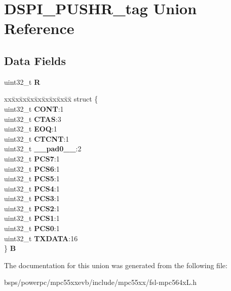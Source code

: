\hypertarget{unionDSPI__PUSHR__tag}{}\section{D\+S\+P\+I\+\_\+\+P\+U\+S\+H\+R\+\_\+tag Union Reference}
\label{unionDSPI__PUSHR__tag}
\subsection*{Data Fields}
\begin{DoxyCompactItemize}
\item 
\mbox{\label{unionDSPI__PUSHR__tag_a521f8ec0aa91d4ba7795fc6c94f2215a}} 
uint32\+\_\+t {\bfseries R}
\item 
\mbox{\label{unionDSPI__PUSHR__tag_a2f18a2239ed951a858642061508555af}} 
\begin{tabbing}
xx\=xx\=xx\=xx\=xx\=xx\=xx\=xx\=xx\=\kill
struct \{\\
\>uint32\_t {\bfseries CONT}:1\\
\>uint32\_t {\bfseries CTAS}:3\\
\>uint32\_t {\bfseries EOQ}:1\\
\>uint32\_t {\bfseries CTCNT}:1\\
\>uint32\_t {\bfseries \_\_pad0\_\_}:2\\
\>uint32\_t {\bfseries PCS7}:1\\
\>uint32\_t {\bfseries PCS6}:1\\
\>uint32\_t {\bfseries PCS5}:1\\
\>uint32\_t {\bfseries PCS4}:1\\
\>uint32\_t {\bfseries PCS3}:1\\
\>uint32\_t {\bfseries PCS2}:1\\
\>uint32\_t {\bfseries PCS1}:1\\
\>uint32\_t {\bfseries PCS0}:1\\
\>uint32\_t {\bfseries TXDATA}:16\\
\} {\bfseries B}\\

\end{tabbing}\end{DoxyCompactItemize}


The documentation for this union was generated from the following file\+:\begin{DoxyCompactItemize}
\item 
bsps/powerpc/mpc55xxevb/include/mpc55xx/fsl-\/mpc564x\+L.\+h\end{DoxyCompactItemize}
